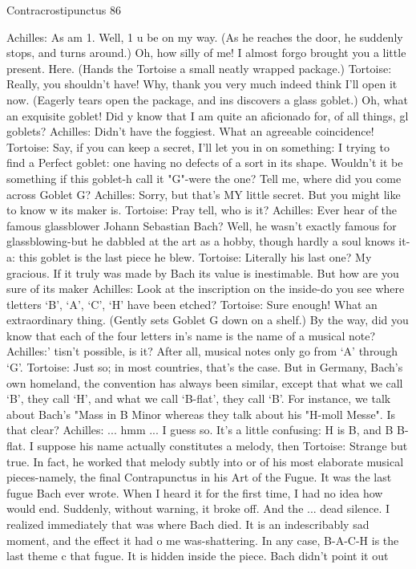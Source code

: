 Contracrostipunctus                                                                      86

Achilles: As am 1. Well, 1 u be on my way. (As he reaches the door, he suddenly stops,
       and turns around.) Oh, how silly of me! I almost forgo brought you a little
       present. Here. (Hands the Tortoise a small neatly wrapped package.)
Tortoise: Really, you shouldn't have! Why, thank you very much indeed think I'll open it
       now. (Eagerly tears open the package, and ins discovers a glass goblet.) Oh, what
       an exquisite goblet! Did y know that I am quite an aficionado for, of all things, gl
       goblets?
Achilles: Didn't have the foggiest. What an agreeable coincidence!
Tortoise: Say, if you can keep a secret, I'll let you in on something: I trying to find a
       Perfect goblet: one having no defects of a sort in its shape. Wouldn't it be
       something if this goblet-h call it "G"-were the one? Tell me, where did you come
       across Goblet G?
Achilles: Sorry, but that's MY little secret. But you might like to know w its maker is.
Tortoise: Pray tell, who is it?
Achilles: Ever hear of the famous glassblower Johann Sebastian Bach? Well, he wasn't
       exactly famous for glassblowing-but he dabbled at the art as a hobby, though
       hardly a soul knows it-a: this goblet is the last piece he blew.
Tortoise: Literally his last one? My gracious. If it truly was made by Bach its value is
       inestimable. But how are you sure of its maker
Achilles: Look at the inscription on the inside-do you see where tletters `B', `A', `C', `H'
       have been etched?
Tortoise: Sure enough! What an extraordinary thing. (Gently sets Goblet G down on a
       shelf.) By the way, did you know that each of the four letters in\Bach's name is
       the name of a musical note?
Achilles:' tisn't possible, is it? After all, musical notes only go from ‘A’ through `G'.
Tortoise: Just so; in most countries, that's the case. But in Germany, Bach’s own
       homeland, the convention has always been similar, except that what we call `B',
       they call `H', and what we call `B-flat', they call `B'. For instance, we talk about
       Bach's "Mass in B Minor whereas they talk about his "H-moll Messe". Is that
       clear?
Achilles:        ... hmm ... I guess so. It's a little confusing: H is B, and B B-flat. I suppose
       his name actually constitutes a melody, then
Tortoise: Strange but true. In fact, he worked that melody subtly into or of his most
       elaborate musical pieces-namely, the final Contrapunctus in his Art of the Fugue.
       It was the last fugue Bach ever wrote. When I heard it for the first time, I had no
       idea how would end. Suddenly, without warning, it broke off. And the ... dead
       silence. I realized immediately that was where Bach died. It is an indescribably
       sad moment, and the effect it had o me was-shattering. In any case, B-A-C-H is
       the last theme c that fugue. It is hidden inside the piece. Bach didn't point it out




